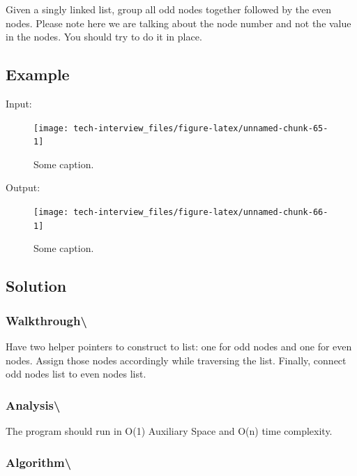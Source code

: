 \documentclass[]{book}
\begin{document}
Given a singly linked list, group all odd nodes together followed by the even nodes. Please note here we
are talking about the node number and not the value in the nodes.
You should try to do it in place.

\hypertarget{example-88}{%
\subsection{Example}\label{example-88}}

Input:

\begin{figure}
\texttt{[image: tech-interview\_files/figure-latex/unnamed-chunk-65-1]} \caption{Some caption.}\label{fig:unnamed-chunk-65}
\end{figure}

Output:

\begin{figure}
\texttt{[image: tech-interview\_files/figure-latex/unnamed-chunk-66-1]} \caption{Some caption.}\label{fig:unnamed-chunk-66}
\end{figure}

\hypertarget{solution-64}{%
\subsection{Solution}\label{solution-64}}

\hypertarget{walkthrough-107}{%
\subsubsection{Walkthrough\textbackslash{}}\label{walkthrough-107}}

Have two helper pointers to construct to list: one for odd nodes and one for even nodes. Assign those nodes
accordingly while traversing the list. Finally, connect odd nodes list to even nodes list.

\hypertarget{analysis-114}{%
\subsubsection{Analysis\textbackslash{}}\label{analysis-114}}

The program should run in O(1) Auxiliary Space and O(n) time complexity.

\hypertarget{algorithm-120}{%
\subsubsection{Algorithm\textbackslash{}}\label{algorithm-120}}
\end{document}
